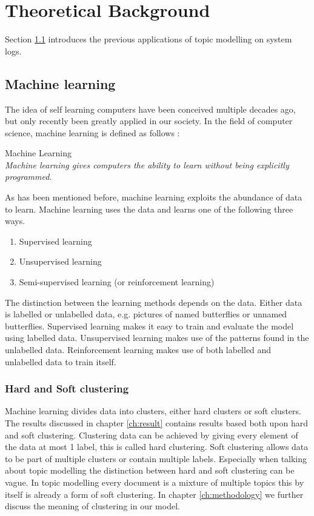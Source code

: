\chapter{Theoretical Background}  \label{ch:theory}


Section \ref{theory:machinelearning} introduces the previous applications of topic modelling on system logs. 

\section{Machine learning} \label{theory:machinelearning}
The idea of self learning computers have been conceived multiple decades ago, but only recently been greatly applied in our society.
In the field of computer science, machine learning is defined as follows \cite{Samuel1959SomeCheckers}:\\

\theoremstyle{definition} 
\begin{definition}{Machine Learning} 
\\\textit{Machine learning gives computers the ability to learn without being explicitly programmed.}
\end{definition}


As has  been mentioned before, machine learning exploits the abundance of data to learn. Machine learning uses the data and learns one of the following three ways. 

\begin{enumerate}
    \item Supervised learning
    \item Unsupervised learning
    \item Semi-supervised learning (or reinforcement learning)
\end{enumerate}

The distinction between the learning methods depends on the data. Either data is labelled or unlabelled data, e.g. pictures of named butterflies or unnamed butterflies. Supervised learning makes it easy to train and evaluate the model using labelled data. Unsupervised learning makes use of the patterns found in the unlabelled data. Reinforcement learning makes use of both labelled and unlabelled data to train itself. 

\subsection{Hard and Soft clustering}
Machine learning divides data into clusters, either hard clusters or soft clusters. The results discussed in chapter \ref{ch:result} contains results based both upon hard and soft clustering. Clustering data can be achieved by giving every element of the data at most 1 label, this is called hard clustering. Soft clustering allows data to be part of multiple clusters or contain multiple labels. Especially when talking about topic modelling the distinction between hard and soft clustering can be vague. In topic modelling every document is a mixture of multiple topics this by itself is already a form of soft clustering. In chapter \ref{ch:methodology} we further discuss the meaning of clustering in our model.

